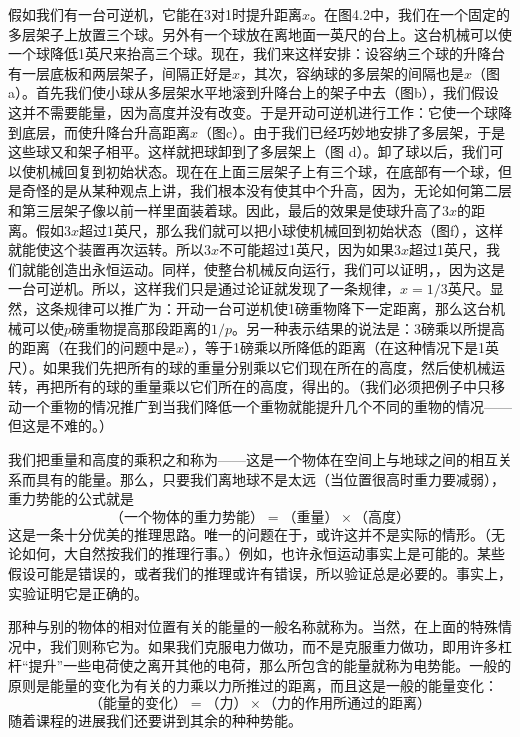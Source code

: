 假如我们有一台可逆机，它能在3对1时提升距离$ x $。在图4.2中，我们在一个固定的多层架子上放置三个球。另外有一个球放在离地面一英尺的台上。这台机械可以使一个球降低1英尺来抬高三个球。现在，我们来这样安排：设容纳三个球的升降台有一层底板和两层架子，间隔正好是$ x $，其次，容纳球的多层架的间隔也是$ x $（图a）。首先我们使小球从多层架水平地滚到升降台上的架子中去（图b），我们假设这并不需要能量，因为高度并没有改变。于是开动可逆机进行工作：它使一个球降到底层，而使升降台升高距离$ x $（图c）。由于我们已经巧妙地安排了多层架，于是这些球又和架子相平。这样就把球卸到了多层架上（图 d）。卸了球以后，我们可以使机械回复到初始状态。现在在上面三层架子上有三个球，在底部有一个球，但是奇怪的是从某种观点上讲，我们根本没有使其中个升高，因为，无论如何第二层和第三层架子像以前一样里面装着球。因此，最后的效果是使球升高了$ 3x$的距离。假如$  3x $超过1英尺，那么我们就可以把小球使机械回到初始状态（图f），这样就能使这个装置再次运转。所以$ 3x $不可能超过1英尺，因为如果$ 3x $超过1英尺，我们就能创造出永恒运动。同样，使整台机械反向运行，我们可以证明，，因为这是一台可逆机。所以，这样我们只是通过论证就发现了一条规律，$x=1/3$英尺。显然，这条规律可以推广为：开动一台可逆机使1磅重物降下一定距离，那么这台机械可以使$p$磅重物提高那段距离的$1/p$。另一种表示结果的说法是：3磅乘以所提高的距离（在我们的问题中是$ x $），等于1磅乘以所降低的距离（在这种情况下是1英尺）。如果我们先把所有的球的重量分别乘以它们现在所在的高度，然后使机械运转，再把所有的球的重量乘以它们所在的高度，得出的。（我们必须把例子中只移动一个重物的情况推广到当我们降低一个重物就能提升几个不同的重物的情况——但这是不难的。）

我们把重量和高度的乘积之和称为——这是一个物体在空间上与地球之间的相互关系而具有的能量。那么，只要我们离地球不是太远（当位置很高时重力要减弱），重力势能的公式就是
\begin{equation}
    \label{Eq:I:4:3}
    \text{（一个物体的重力势能）}=
    \text{（重量）}\times\text{（高度）}
\end{equation}
这是一条十分优美的推理思路。唯一的问题在于，或许这并不是实际的情形。（无论如何，大自然按我们的推理行事。）例如，也许永恒运动事实上是可能的。某些假设可能是错误的，或者我们的推理或许有错误，所以验证总是必要的。事实上，实验证明它是正确的。

那种与别的物体的相对位置有关的能量的一般名称就称为。当然，在上面的特殊情况中，我们则称它为。如果我们克服电力做功，而不是克服重力做功，即用许多杠杆“提升”一些电荷使之离开其他的电荷，那么所包含的能量就称为电势能。一般的原则是能量的变化为有关的力乘以力所推过的距离，而且这是一般的能量变化：
\begin{equation}
    \label{Eq:I:4:4}
    \text{（能量的变化）}=
    \text{（力）}\times\text{（力的作用所通过的距离）}
\end{equation}
随着课程的进展我们还要讲到其余的种种势能。


